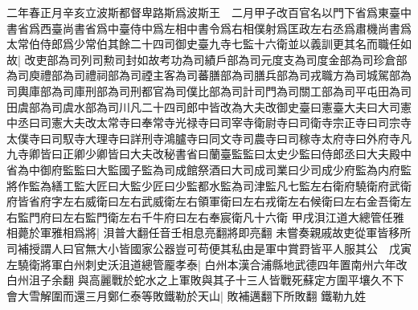 二年春正月辛亥立波斯都督卑路斯爲波斯王　二月甲子改百官名以門下省爲東臺中書省爲西臺尚書省爲中臺侍中爲左相中書令爲右相僕射爲匡政左右丞爲肅機尚書爲太常伯侍郎爲少常伯其餘二十四司御史臺九寺七監十六衛並以義訓更其名而職任如故|{
	改吏部為司列司勲司封如故考功為司績戶部為司元度支為司度金部為司珍倉部為司庾禮部為司禮祠部為司禋主客為司蕃膳部為司膳兵部為司戎職方為司城駕部為司輿庫部為司庫刑部為司刑都官為司僕比部為司計司門為司關工部為司平屯田為司田虞部為司虞水部為司川凡二十四司郎中皆改為大夫改御史臺曰憲臺大夫曰大司憲中丞曰司憲大夫改太常寺曰奉常寺光禄寺曰司宰寺衛尉寺曰司衛寺宗正寺曰司宗寺太僕寺曰司馭寺大理寺曰詳刑寺鴻臚寺曰同文寺司農寺曰司稼寺太府寺曰外府寺凡九寺卿皆曰正卿少卿皆曰大夫改秘書省曰蘭臺監監曰太史少監曰侍郎丞曰大夫殿中省為中御府監監曰大監國子監為司成館祭酒曰大司成司業曰少司成少府監為内府監將作監為繕工監大匠曰大監少匠曰少監都水監為司津監凡七監左右衛府驍衛府武衛府皆省府字左右威衛曰左右武威衛左右領軍衛曰左右戎衛左右候衛曰左右金吾衛左右監門府曰左右監門衛左右千牛府曰左右奉宸衛凡十六衛}
甲戌浿江道大總管任雅相薨於軍雅相爲將|{
	浿普大翻任音壬相息亮翻將即亮翻}
未嘗奏親戚故吏從軍皆移所司補授謂人曰官無大小皆國家公器豈可苟便其私由是軍中賞罸皆平人服其公　戊寅左驍衛將軍白州刺史沃沮道總管龎孝泰|{
	白州本漢合浦縣地武德四年置南州六年改白州沮子余翻}
與高麗戰於蛇水之上軍敗與其子十三人皆戰死蘇定方圍平壤久不下會大雪解圍而還三月鄭仁泰等敗鐵勒於天山|{
	敗補邁翻下所敗翻}
鐵勒九姓

